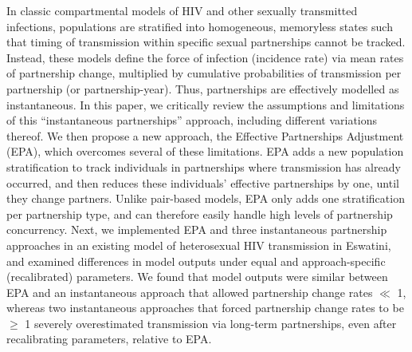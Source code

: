 In classic compartmental models of HIV and other sexually transmitted infections,
populations are stratified into homogeneous, memoryless states
such that timing of transmission within specific sexual partnerships cannot be tracked.
Instead, these models define the force of infection (incidence rate) via
mean rates of partnership change, multiplied by
cumulative probabilities of transmission per partnership (or partnership-year).
Thus, partnerships are effectively modelled as instantaneous.
In this paper, we critically review
the assumptions and limitations of this ``instantaneous partnerships'' approach,
including different variations thereof.
We then propose a new approach, the Effective Partnerships Adjustment (EPA),
which overcomes several of these limitations.
EPA adds a new population stratification to track
individuals in partnerships where transmission has already occurred,
and then reduces these individuals' effective partnerships by one,
until they change partners.
Unlike pair-based models, EPA only adds one stratification per partnership type,
and can therefore easily handle high levels of partnership concurrency.
Next, we implemented EPA and three instantaneous partnership approaches
in an existing model of heterosexual HIV transmission in Eswatini,
and examined differences in model outputs
under equal and approach-specific (recalibrated) parameters.
We found that model outputs were similar between EPA and
an instantaneous approach that allowed partnership change rates $\ll$ 1, whereas
two instantaneous approaches that forced partnership change rates to be $\ge$ 1
severely overestimated transmission via long-term partnerships,
even after recalibrating parameters, relative to EPA.
